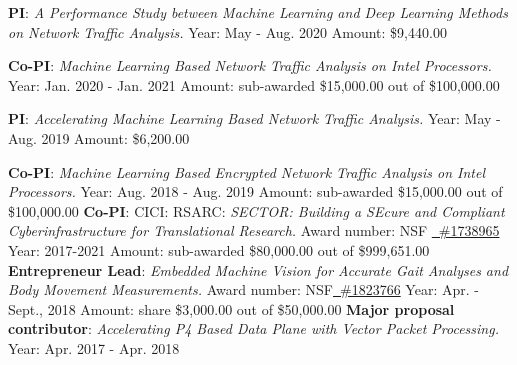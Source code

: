 \documentclass[11pt]{moderncv}
\begin{document}
%
{\textbf{PI}: \textit{A Performance Study between Machine Learning and Deep Learning Methods on	Network Traffic Analysis.} \newline
	Year: May - Aug. 2020 \newline
	Amount: \$9,440.00
}

%
{\textbf{Co-PI}: \textit{Machine Learning Based Network Traffic Analysis on Intel Processors.} \newline
	Year: Jan. 2020 - Jan. 2021 \newline
	Amount: sub-awarded \$15,000.00 out of \$100,000.00
}

%
{\textbf{PI}: \textit{Accelerating Machine Learning Based Network Traffic Analysis.} \newline
	Year: May - Aug. 2019 \newline
	Amount: \$6,200.00
}

%
{\textbf{Co-PI}: \textit{Machine Learning Based Encrypted Network Traffic Analysis on Intel Processors.} \newline
Year: Aug. 2018 - Aug. 2019 \newline
Amount: sub-awarded \$15,000.00 out of \$100,000.00
}
%
{\textbf{Co-PI}: CICI: RSARC: \textit{SECTOR: Building a {SE}cure and Compliant {C}yberinfrastructure for {T}ranslati{o}nal {R}esearch.} \newline
	Award number: NSF \href{https://nsf.gov/awardsearch/showAward?AWD_ID=1738965}
	{\color{color2}\homepagesymbol~\#1738965} \newline
	Year: 2017-2021 \newline
	Amount:  sub-awarded \$80,000.00 out of \$999,651.00
}
%
{\textbf{Entrepreneur Lead}: \textit{Embedded Machine Vision for Accurate Gait Analyses and Body Movement Measurements.} \newline
Award number: NSF\href{https://nsf.gov/awardsearch/showAward?AWD_ID=1823766}
  {\color{color2}\homepagesymbol~\#1823766} \newline
Year: Apr. - Sept., 2018 \newline
Amount:  share \$3,000.00 out of \$50,000.00
}
%
{\textbf{Major proposal contributor}: \textit{Accelerating P4 Based Data Plane with Vector Packet Processing.} \newline
Year: Apr. 2017 - Apr. 2018
}
\end{document}
